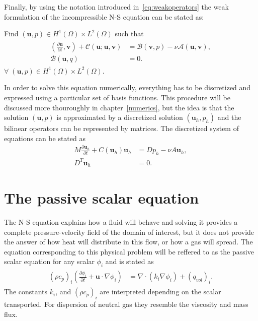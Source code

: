 Finally, by using the notation introduced in~\ref{eq:weakoperators} the weak formulation of the incompressible
N-S equation can be stated as: 

Find $(\mathbf{u}, p) \in H^1(\Omega)\times L^2(\Omega)$ such that 
\begin{align}
    \begin{split}
        (\frac{\partial \mathbf{u}}{\partial t},\mathbf{v})
        + \mathcal{C}(\mathbf{u};\mathbf{u},\mathbf{v})
        &= \mathcal{B}(\mathbf{v},p) 
        -\nu\mathcal{A}(\mathbf{u},\mathbf{v}), \\
        \mathcal{B}(\mathbf{u},q) &= 0.
    \end{split}
	\label{eq:NSweak}
\end{align}
$\forall\; (\mathbf{u}, p) \in H^1(\Omega)\times L^2(\Omega)$.
%

In order to solve this equation numerically, everything has to be discretized and expressed 
using a particular set of basis functions. This procedure will be discussed more thouroughly
in chapter~\ref{numerics}, but the idea is that the solution $(\mathbf{u},p)$ is approximated 
by a discretized solution $(\mathbf{u}_h,p_h)$ and the bilinear operators can be represented 
by matrices. The discretized system of equations can be stated as
%
\begin{align}
    M\frac{\partial \mathbf{u}_h}{\partial t} +C(\mathbf{u}_h)\mathbf{u}_h &= Dp_h-\nu A\mathbf{u}_h,\\
    D^T\mathbf{u}_h &= 0.
    \label{eq:NSMatrixform}
\end{align}
%
\section{The passive scalar equation}
The N-S equation explains how a fluid will behave and solving it provides a complete pressure-velocity field of the 
domain of interest, but it does not provide the answer of how heat will distribute in this flow, or how a gas will spread.
The equation corresponding to this physical problem will be reffered to as the passive scalar equation for any scalar 
$\phi_i$ and is stated as 
\begin{align}
    \begin{split}
        (\rho c_p)_i(\frac{\partial \phi_i}{\partial t} + \mathbf{u}\cdot \nabla\phi_i) 
        &= \nabla \cdot(k_i\nabla \phi_i)+ (q_{vol})_i.
    \end{split}
	\label{eq:PS}
\end{align}
The constants  $k_i$, and $(\rho c_p)_i$ are interpreted depending on 
the scalar transported. For dispersion of neutral gas they 
resemble the viscosity and mass flux. 

